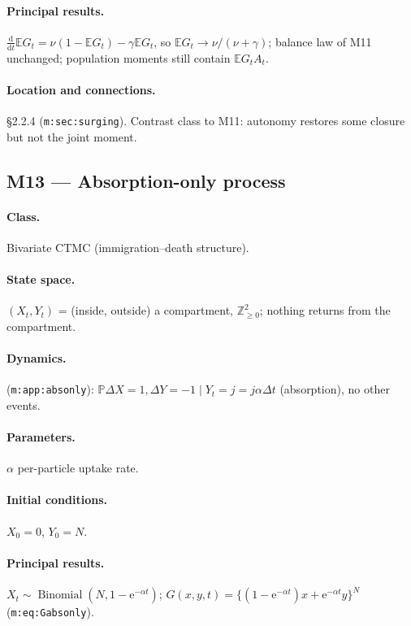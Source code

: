\documentclass[11pt,a4paper]{article}
\newcommand{\PR}{\mathbb{P}}
\newcommand{\EX}{\mathbb{E}}
\newcommand{\ee}{\mathrm{e}}
\newcommand{\dd}{\mathrm{d}}
\begin{document}
\paragraph{Principal results.} $\frac{\dd}{\dd t}\EX{G_t}=\nu(1-\EX{G_t})-
\gamma\EX{G_t}$, so $\EX{G_t}\to\nu/(\nu+\gamma)$; balance law of M11
unchanged; population moments still contain $\EX{G_tA_t}$.

\paragraph{Location and connections.} \S2.2.4 (\texttt{m:sec:surging}).
Contrast class to M11: autonomy restores some closure but not the joint
moment.

\subsection{M13 --- Absorption-only process}

\paragraph{Class.} Bivariate CTMC (immigration--death structure).

\paragraph{State space.} $(X_t,Y_t)$ = (inside, outside) a compartment,
$\mathbb Z_{\ge0}^2$; nothing returns from the compartment.

\paragraph{Dynamics.} (\texttt{m:app:absonly}):
$\PR{\Delta X=1,\Delta Y=-1\mid Y_t=j}=j\alpha\Delta t$ (absorption), no
other events.

\paragraph{Parameters.} $\alpha$ per-particle uptake rate.

\paragraph{Initial conditions.} $X_0=0$, $Y_0=N$.

\paragraph{Principal results.} $X_t\sim\operatorname{Binomial}(N,
1-\ee^{-\alpha t})$; $G(x,y,t)=\{(1-\ee^{-\alpha t})x+\ee^{-\alpha t}y\}^N$
(\texttt{m:eq:Gabsonly}).
\end{document}
